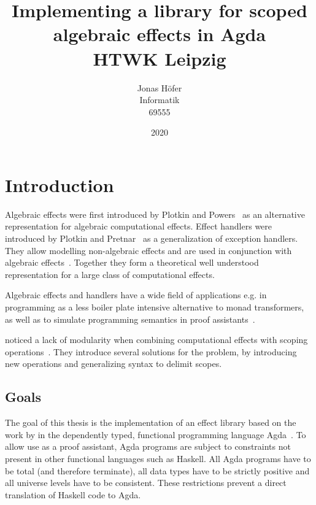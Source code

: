 \documentclass[10pt,a4paper,twoside]{report}
\title{
  {\huge\textbf{Implementing a library for scoped algebraic effects in Agda}}\\
  {\large HTWK Leipzig}
}
\author{
  {Jonas Höfer}\\
  {Informatik}\\
  {69555}
}
\date{2020}
\begin{document}
\maketitle
\begin{abstract}
\end{abstract}

\tableofcontents

\chapter{Introduction}

Algebraic effects were first introduced by Plotkin and
Powers~\cite{DBLP:journals/acs/PlotkinP03} as an alternative representation for
algebraic computational effects.
Effect handlers were introduced by Plotkin and
Pretnar~\cite{DBLP:conf/esop/PlotkinP09} as a generalization of exception
handlers.
They allow modelling non-algebraic effects and are used in conjunction with
algebraic effects~\cite{DBLP:journals/corr/PlotkinP13}.
Together they form a theoretical well understood representation for a large
class of computational effects.

Algebraic effects and handlers have a wide field of applications e.g. in
programming as a less boiler plate intensive alternative to monad transformers,
as well as to simulate programming semantics in proof
assistants~\cite{DBLP:journals/programming/DylusCT19,DBLP:conf/haskell/ChristiansenDB19}.

\citeauthor{DBLP:conf/haskell/WuSH14} noticed a lack of modularity when
combining computational effects with scoping
operations~\cite{DBLP:conf/haskell/WuSH14}.
They introduce several solutions for the problem, by introducing new operations
and generalizing syntax to delimit scopes.


\section{Goals}

The goal of this thesis is the implementation of an effect library based on the
work by \textcite{DBLP:conf/haskell/WuSH14,DBLP:conf/lics/PirogSWJ18} in
the dependently typed, functional programming language
Agda~\cite{norell:thesis}.
To allow use as a proof assistant, Agda programs are subject to constraints not
present in other functional languages such as Haskell.
All Agda programs have to be total (and therefore terminate), all data types
have to be strictly positive and all universe levels have to be consistent.
These restrictions prevent a direct translation of Haskell code to Agda.
\end{document}
